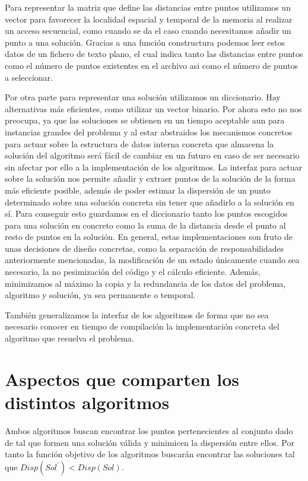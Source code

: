 Para representar la matriz que define las distancias entre puntos utilizamos un vector para favorecer la localidad espacial y
temporal de la memoria al realizar un acceso secuencial, como cuando se da el caso cuando necesitamos añadir un punto a una solución.
Gracias a una función constructura podemos leer estos datos de un fichero de texto plano, el cual indica tanto las distancias entre
puntos como el número de puntos existentes en el archivo asi como el número de puntos a seleccionar.

Por otra parte para representar una solución utilizamos un diccionario. Hay alternativas más eficientes, como utilizar un vector binario.
Por ahora esto no nos preocupa, ya que las soluciones se obtienen en un tiempo aceptable aun para instancias grandes del problema y 
al estar abstraidos los mecanismos concretos para actuar sobre la estructura de datos interna concreta que almacena la solución del
algoritmo será fácil de cambiar en un futuro en caso de ser necesario sin afectar por ello a la implementación de los algoritmos. La
interfaz para actuar sobre la solución nos permite añadir y extraer puntos de la solución de la forma más eficiente posible, además
de poder estimar la dispersión de un punto determinado sobre una solución concreta sin tener que añadirlo a la solución en sí. Para
conseguir esto guardamos en el diccionario tanto los puntos escogidos para una solución en concreto como la suma de la distancia desde
el punto al resto de puntos en la solución. En general, estas implementaciones son fruto de unas decisiones de diseño concretas, como la
separación de responsabilidades anteriormente mencionadas, la modificación de un estado únicamente cuando sea necesario, la no pesimización
del código y el cálculo eficiente. Además, minimizamos al máximo la copia y la redundancia de los datos del problema, algoritmo y solución,
ya sea permanente o temporal.

También generalizamos la interfaz de los algoritmos de forma que no sea necesario conocer en tiempo de compilación la implementación
concreta del algoritmo que resuelva el problema.

\section{Aspectos que comparten los distintos algoritmos}

Ambos algoritmos buscan encontrar los puntos pertenecientes al conjunto dado de tal que formen una solución válida y minimicen la dispersión
entre ellos. Por tanto la función objetivo de los algoritmos buscarán encontrar las soluciones tal que $ Disp(Sol^{\prime}) < Disp(Sol) $.
